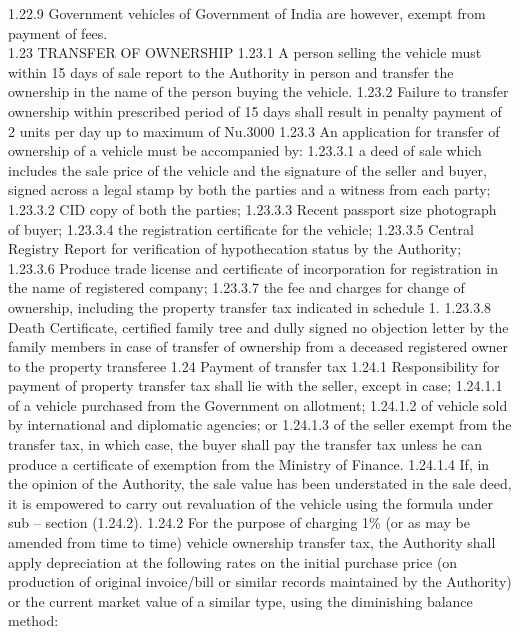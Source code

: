 \documentclass[
]{book}
\begin{document}
1.22.9 Government vehicles of Government of India are however, exempt from payment of fees.\\
1.23 TRANSFER OF OWNERSHIP
1.23.1 A person selling the vehicle must within 15 days of sale report to the Authority in person and transfer the ownership in the name of the person buying the vehicle.
1.23.2 Failure to transfer ownership within prescribed period of 15 days shall result in penalty payment of 2 units per day up to maximum of Nu.3000
1.23.3 An application for transfer of ownership of a vehicle must be accompanied by:
1.23.3.1 a deed of sale which includes the sale price of the vehicle and the signature of the seller and buyer, signed across a legal stamp by both the parties and a witness from each party;
1.23.3.2 CID copy of both the parties;
1.23.3.3 Recent passport size photograph of buyer;
1.23.3.4 the registration certificate for the vehicle;
1.23.3.5 Central Registry Report for verification of hypothecation status by the Authority;
1.23.3.6 Produce trade license and certificate of incorporation for registration in the name of registered company;
1.23.3.7 the fee and charges for change of ownership, including the property transfer tax indicated in schedule 1.
1.23.3.8 Death Certificate, certified family tree and dully signed no objection letter by the family members in case of transfer of ownership from a deceased registered owner to the property transferee
1.24 Payment of transfer tax
1.24.1 Responsibility for payment of property transfer tax shall lie with the seller, except in case;
1.24.1.1 of a vehicle purchased from the Government on allotment;
1.24.1.2 of vehicle sold by international and diplomatic agencies; or
1.24.1.3 of the seller exempt from the transfer tax, in which case, the buyer shall pay the transfer tax unless he can produce a certificate of exemption from the Ministry of Finance.
1.24.1.4 If, in the opinion of the Authority, the sale value has been understated in the sale deed, it is empowered to carry out revaluation of the vehicle using the formula under sub -- section (1.24.2).
1.24.2 For the purpose of charging 1\% (or as may be amended from time to time) vehicle ownership transfer tax, the Authority shall apply depreciation at the following rates on the initial purchase price (on production of original invoice/bill or similar records maintained by the Authority) or the current market value of a similar type, using the diminishing balance method:
\end{document}
